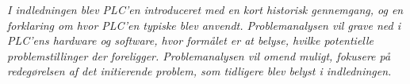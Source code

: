 \textit{I indledningen blev PLC’en introduceret med en kort historisk gennemgang, og en forklaring om hvor PLC’en typiske blev anvendt. Problemanalysen vil grave ned i PLC’ens hardware og software, hvor formålet er at belyse, hvilke potentielle problemstillinger der foreligger. Problemanalysen vil omend muligt, fokusere på redegørelsen af det initierende problem, som tidligere blev belyst i indledningen.}

